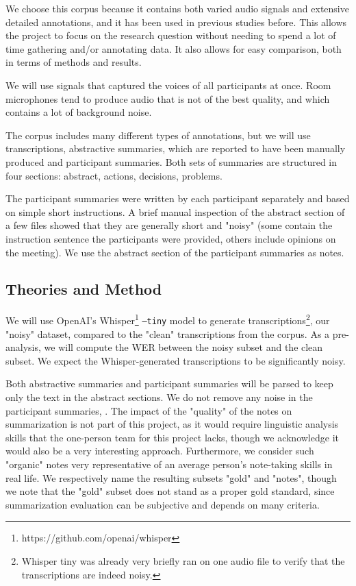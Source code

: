 \documentclass[11pt]{article}
\begin{document}
We choose this corpus because it contains both varied audio signals and extensive detailed annotations, and it has been used in previous studies before.
This allows the project to focus on the research question without needing to spend a lot of time gathering and/or annotating data.
It also allows for easy comparison, both in terms of methods and results.

We will use signals that captured the voices of all participants at once.
Room microphones tend to produce audio that is not of the best quality, and which contains a lot of background noise.

The corpus includes many different types of annotations, but we will use transcriptions, abstractive summaries, which are reported to have been manually produced \citep{retkowski-etal-2025-survey} and participant summaries.
Both sets of summaries are structured in four sections: abstract, actions, decisions, problems.

The participant summaries were written by each participant separately and based on simple short instructions.
A brief manual inspection of the abstract section of a few files showed that they are generally short and "noisy" (some contain the instruction sentence the participants were provided, others include opinions on the meeting).
We use the abstract section of the participant summaries as notes.

\subsection{Theories and Method}

We will use OpenAI's Whisper\footnote{https://github.com/openai/whisper} \texttt{--tiny} model to generate transcriptions\footnote{Whisper tiny was already very briefly ran on one audio file to verify that the transcriptions are indeed noisy.}, our "noisy" dataset, compared to the "clean" transcriptions from the corpus.
As a pre-analysis, we will compute the WER between the noisy subset and the clean subset.
We expect the Whisper-generated transcriptions to be significantly noisy.

Both abstractive summaries and participant summaries will be parsed to keep only the text in the abstract sections.
We do not remove any noise in the participant summaries, .
The impact of the "quality" of the notes on summarization is not part of this project, as it would require linguistic analysis skills that the one-person team for this project lacks, though we acknowledge it would also be a very interesting approach.
Furthermore, we consider such "organic" notes very representative of an average person's note-taking skills in real life.
We respectively name the resulting subsets "gold" and "notes", though we note that the "gold" subset does not stand as a proper gold standard, since summarization evaluation can be subjective and depends on many criteria.
\end{document}
